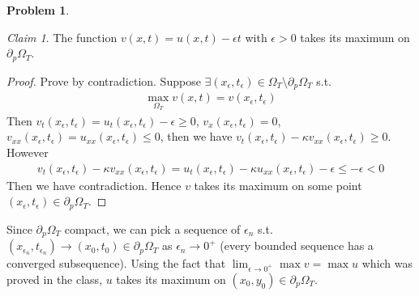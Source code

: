 \documentclass[twoside,11pt]{article}
\theoremstyle{definition}
\newtheorem{problem}{Problem}
\theoremstyle{remark}
\newtheorem*{claim}{Claim}
\begin{document}
\begin{problem}
\begin{claim}
    The function $v(x, t) = u(x, t) - \epsilon t$ with $\epsilon>0$ takes its maximum on
    $\partial_p\Omega_T$.
\end{claim}
\begin{proof}
    Prove by contradiction.
    Suppose $\exists (x_\epsilon, t_\epsilon)\in\Omega_T\setminus\partial_p\Omega_T$ s.t.
    \begin{align*}
        \max_{\Omega_T} v(x, t) = v(x_\epsilon, t_\epsilon)
    \end{align*}
    Then $v_{t}(x_\epsilon, t_\epsilon) = u_t(x_\epsilon, t_\epsilon) - \epsilon\geq 0$, $v_x(x_\epsilon,t_\epsilon)=0$, 
    $v_{xx}(x_\epsilon, t_\epsilon)=u_{xx}(x_\epsilon,t_\epsilon) \leq 0$, then we have
    $v_{t}(x_\epsilon, t_\epsilon)-\kappa v_{xx}(x_\epsilon, t_\epsilon)\geq 0$. However
    \begin{align*}
        v_{t}(x_\epsilon, t_\epsilon) - \kappa v_{xx}(x_\epsilon, t_\epsilon) = u_t(x_\epsilon, t_\epsilon) - \kappa u_{xx}(x_\epsilon, t_\epsilon) - \epsilon
        \leq -\epsilon < 0
    \end{align*}
    Then we have contradiction.
    Hence $v$ takes its maximum on some point $(x_\epsilon, t_\epsilon)\in\partial_p\Omega_T$.
\end{proof}
Since $\partial_p\Omega_T$ compact, we can pick a sequence
of $\epsilon_n$ s.t. $(x_{\epsilon_n}, t_{\epsilon_n})\rightarrow (x_0, t_0)\in\partial_p
\Omega_T$ as $\epsilon_n\rightarrow 0^+$ (every bounded sequence has a converged subsequence).
Using the fact that $\lim_{\epsilon\rightarrow 0^+}\max v = \max u$ which was proved in the class,
$u$ takes its maximum on $(x_0, y_0)\in\partial_p\Omega_T$.
\end{problem}




\end{document}
